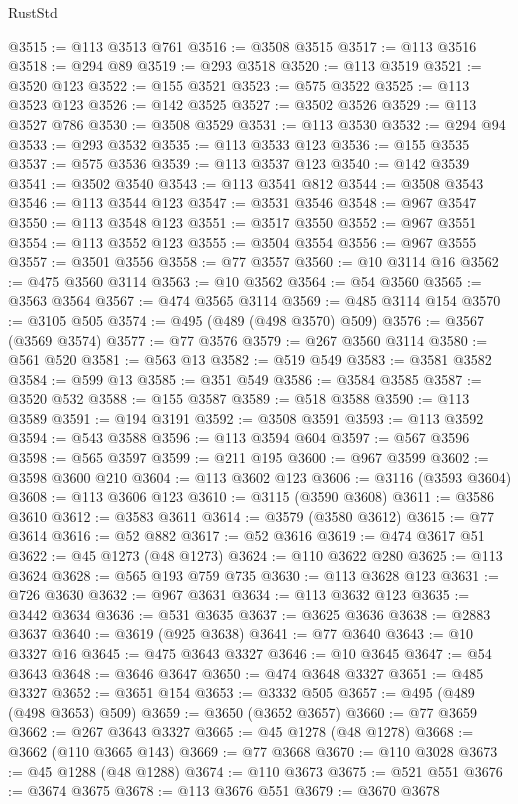 \begin{lexlean}{RustStd}
\begin{coremodule}
@3515 := @113 @3513 @761
@3516 := @3508 @3515
@3517 := @113 @3516
@3518 := @294 @89
@3519 := @293 @3518
@3520 := @113 @3519
@3521 := @3520 @123
@3522 := @155 @3521
@3523 := @575 @3522
@3525 := @113 @3523 @123
@3526 := @142 @3525
@3527 := @3502 @3526
@3529 := @113 @3527 @786
@3530 := @3508 @3529
@3531 := @113 @3530
@3532 := @294 @94
@3533 := @293 @3532
@3535 := @113 @3533 @123
@3536 := @155 @3535
@3537 := @575 @3536
@3539 := @113 @3537 @123
@3540 := @142 @3539
@3541 := @3502 @3540
@3543 := @113 @3541 @812
@3544 := @3508 @3543
@3546 := @113 @3544 @123
@3547 := @3531 @3546
@3548 := @967 @3547
@3550 := @113 @3548 @123
@3551 := @3517 @3550
@3552 := @967 @3551
@3554 := @113 @3552 @123
@3555 := @3504 @3554
@3556 := @967 @3555
@3557 := @3501 @3556
@3558 := @77 @3557
@3560 := @10 @3114 @16
@3562 := @475 @3560 @3114
@3563 := @10 @3562
@3564 := @54 @3560
@3565 := @3563 @3564
@3567 := @474 @3565 @3114
@3569 := @485 @3114 @154
@3570 := @3105 @505
@3574 := @495 (@489 (@498 @3570) @509)
@3576 := @3567 (@3569 @3574)
@3577 := @77 @3576
@3579 := @267 @3560 @3114
@3580 := @561 @520
@3581 := @563 @13
@3582 := @519 @549
@3583 := @3581 @3582
@3584 := @599 @13
@3585 := @351 @549
@3586 := @3584 @3585
@3587 := @3520 @532
@3588 := @155 @3587
@3589 := @518 @3588
@3590 := @113 @3589
@3591 := @194 @3191
@3592 := @3508 @3591
@3593 := @113 @3592
@3594 := @543 @3588
@3596 := @113 @3594 @604
@3597 := @567 @3596
@3598 := @565 @3597
@3599 := @211 @195
@3600 := @967 @3599
@3602 := @3598 @3600 @210
@3604 := @113 @3602 @123
@3606 := @3116 (@3593 @3604)
@3608 := @113 @3606 @123
@3610 := @3115 (@3590 @3608)
@3611 := @3586 @3610
@3612 := @3583 @3611
@3614 := @3579 (@3580 @3612)
@3615 := @77 @3614
@3616 := @52 @882
@3617 := @52 @3616
@3619 := @474 @3617 @51
@3622 := @45 @1273 (@48 @1273)
@3624 := @110 @3622 @280
@3625 := @113 @3624
@3628 := @565 @193 @759 @735
@3630 := @113 @3628 @123
@3631 := @726 @3630
@3632 := @967 @3631
@3634 := @113 @3632 @123
@3635 := @3442 @3634
@3636 := @531 @3635
@3637 := @3625 @3636
@3638 := @2883 @3637
@3640 := @3619 (@925 @3638)
@3641 := @77 @3640
@3643 := @10 @3327 @16
@3645 := @475 @3643 @3327
@3646 := @10 @3645
@3647 := @54 @3643
@3648 := @3646 @3647
@3650 := @474 @3648 @3327
@3651 := @485 @3327
@3652 := @3651 @154
@3653 := @3332 @505
@3657 := @495 (@489 (@498 @3653) @509)
@3659 := @3650 (@3652 @3657)
@3660 := @77 @3659
@3662 := @267 @3643 @3327
@3665 := @45 @1278 (@48 @1278)
@3668 := @3662 (@110 @3665 @143)
@3669 := @77 @3668
@3670 := @110 @3028
@3673 := @45 @1288 (@48 @1288)
@3674 := @110 @3673
@3675 := @521 @551
@3676 := @3674 @3675
@3678 := @113 @3676 @551
@3679 := @3670 @3678

\end{coremodule}
\end{lexlean}

